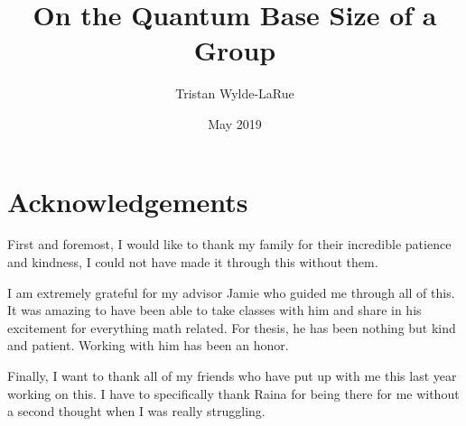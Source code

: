 
\title{On the Quantum Base Size of a Group}
\author{Tristan Wylde-LaRue}
\date{May 2019}






  \maketitle
  \frontmatter %
  \pagestyle{empty} %

    \chapter*{Acknowledgements}
    First and foremost, I would like to thank my family for their incredible patience and kindness, I could not 
    have made it through this without them. 

    I am extremely grateful for my advisor Jamie who guided me through all of this. It was amazing to have been 
    able to take classes with him and share in his excitement for everything math related. For thesis, he has been 
    nothing but kind and patient. Working with him has been an honor.

    Finally, I want to thank all of my friends who have put up with me this last year working on this. I have to 
    specifically thank Raina for being there for me without a second thought when I was really struggling.

	
	


